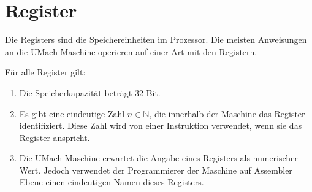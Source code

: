 \section{Register}
\label{sec:Register}

Die \glspl{Register} sind die Speichereinheiten im Prozessor.
Die meisten Anweisungen an die UMach Maschine operieren auf einer Art mit den
Registern.

Für alle Register gilt:
\begin{enumerate}
  \item Die Speicherkapazität beträgt 32 Bit.
  \item Es gibt eine eindeutige Zahl $n \in \mathds{N}$, die innerhalb der
    Maschine das Register identifiziert. Diese Zahl wird von einer Instruktion
    verwendet, wenn sie das Register anspricht.
  \item Die UMach Maschine erwartet die Angabe eines Registers als numerischer
    Wert. Jedoch verwendet der Programmierer der Maschine auf Assembler Ebene
    einen eindeutigen Namen dieses Registers.
\end{enumerate}






